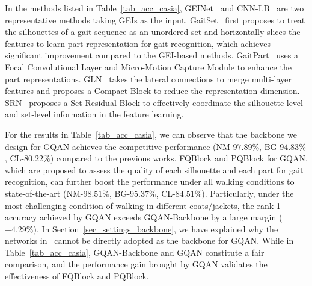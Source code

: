 In the methods listed in Table~\ref{tab_acc_casia}, GEINet~\cite{shiraga2016geinet} and CNN-LB~\cite{wu2016comprehensive} are two representative methods taking GEIs as the input.
%
GaitSet~\cite{chao2019gaitset} first proposes to treat the silhouettes of a gait sequence as an unordered set and horizontally slices the features to learn part representation for gait recognition, which achieves significant improvement compared to the GEI-based methods.
%
GaitPart~\cite{fan2020gaitpart} uses a Focal Convolutional Layer and Micro-Motion Capture Module to enhance the part representations.
%
GLN~\cite{hou2020gait} takes the lateral connections to merge multi-layer features and proposes a Compact Block to reduce the representation dimension.
%
SRN~\cite{hou2021setres} proposes a Set Residual Block to effectively coordinate the silhouette-level and set-level information in the feature learning.

For the results in Table~\ref{tab_acc_casia}, we can observe that the backbone we design for GQAN achieves the competitive performance (NM-$97.89\%$, BG-$94.83\%$, CL-$80.22\%$) compared to the previous works.
%
FQBlock and PQBlock for GQAN, which are proposed to assess the quality of each silhouette and each part for gait recognition, can further boost the performance under all walking conditions to state-of-the-art (NM-$98.51\%$, BG-$95.37\%$, CL-$84.51\%$).
%
Particularly, under the most challenging condition of walking in different coats/jackets, the rank-1 accuracy achieved by GQAN exceeds GQAN-Backbone by a large margin ($+4.29\%$).
%
In Section~\ref{sec_settings_backbone}, we have explained why the networks in~\cite{chao2019gaitset,fan2020gaitpart,hou2020gait,hou2021setres} cannot be directly adopted as the backbone for GQAN.
%
While in Table~\ref{tab_acc_casia}, GQAN-Backbone and GQAN constitute a fair comparison, and the performance gain brought by GQAN validates the effectiveness of FQBlock and PQBlock.

\begin{table}[!tbp]
	\caption{
	The performance comparison on HID Competition Dataset 2021. The results are reported in the rank-1 accuracy.
	}
	\label{tab_hid}
	\begin{center}
	\end{center}
\end{table}

